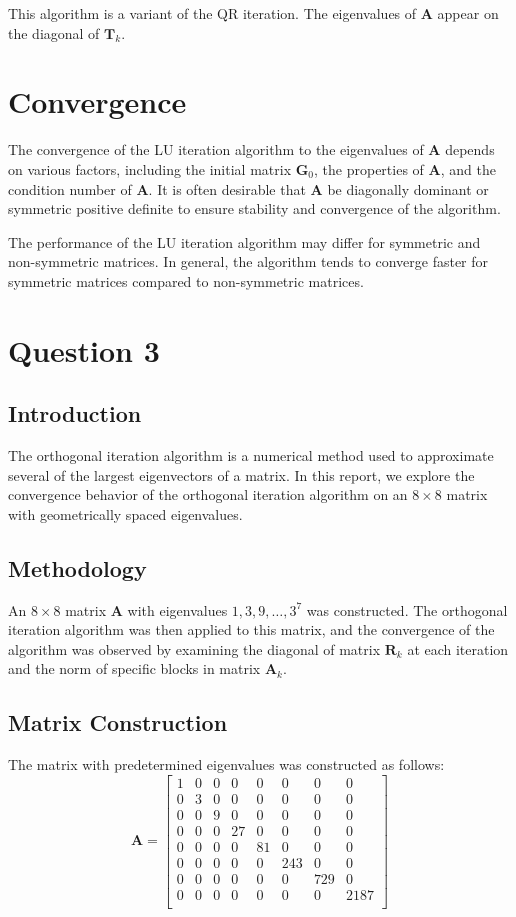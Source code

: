 \documentclass{article}
\begin{document}
This algorithm is a variant of the QR iteration. The eigenvalues of $\boldsymbol{A}$ appear on the diagonal of $\boldsymbol{T}_k$.

\section*{Convergence}
The convergence of the LU iteration algorithm to the eigenvalues of $\boldsymbol{A}$ depends on various factors, including the initial matrix $\boldsymbol{G}_0$, the properties of $\boldsymbol{A}$, and the condition number of $\boldsymbol{A}$. It is often desirable that $\boldsymbol{A}$ be diagonally dominant or symmetric positive definite to ensure stability and convergence of the algorithm.

The performance of the LU iteration algorithm may differ for symmetric and non-symmetric matrices. In general, the algorithm tends to converge faster for symmetric matrices compared to non-symmetric matrices.

\section{Question 3}
\subsection{Introduction}
The orthogonal iteration algorithm is a numerical method used to approximate several of the largest eigenvectors of a matrix. In this report, we explore the convergence behavior of the orthogonal iteration algorithm on an $8 \times 8$ matrix with geometrically spaced eigenvalues.

\subsection{Methodology}
An $8 \times 8$ matrix $\mathbf{A}$ with eigenvalues $1, 3, 9, \ldots, 3^{7}$ was constructed. The orthogonal iteration algorithm was then applied to this matrix, and the convergence of the algorithm was observed by examining the diagonal of matrix $\mathbf{R}_k$ at each iteration and the norm of specific blocks in matrix $\mathbf{A}_k$.

\subsection{Matrix Construction}
The matrix with predetermined eigenvalues was constructed as follows:
\[
\mathbf{A} = \begin{bmatrix}
1 & 0 & 0 & 0 & 0 & 0 & 0 & 0 \\
0 & 3 & 0 & 0 & 0 & 0 & 0 & 0 \\
0 & 0 & 9 & 0 & 0 & 0 & 0 & 0 \\
0 & 0 & 0 & 27 & 0 & 0 & 0 & 0 \\
0 & 0 & 0 & 0 & 81 & 0 & 0 & 0 \\
0 & 0 & 0 & 0 & 0 & 243 & 0 & 0 \\
0 & 0 & 0 & 0 & 0 & 0 & 729 & 0 \\
0 & 0 & 0 & 0 & 0 & 0 & 0 & 2187 \\
\end{bmatrix}
\]
\end{document}
